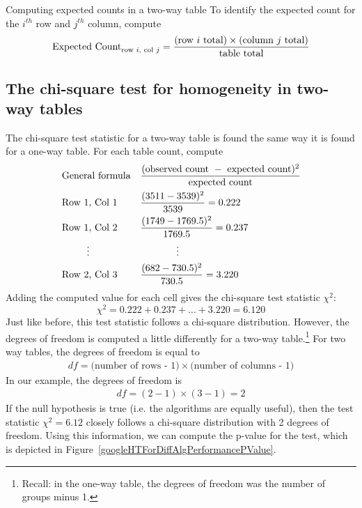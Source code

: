 \D{\newpage}

\begin{onebox}{Computing expected counts in a two-way table}
To identify the expected count for the $i^{th}$ row and $j^{th}$ column, compute
$$\text{Expected Count}_{\text{row }i,\text{ col }j} = \frac{(\text{row $i$ total}) \times  (\text{column $j$ total})}{\text{table total}}\vspace{2mm}$$\end{onebox}


\subsection{The chi-square test for homogeneity in two-way tables}

The chi-square test statistic for a two-way table is found the same way it is found for a one-way table. For each table count, compute
\begin{align*}
&\text{General formula}& &\frac{(\text{observed count } - \text{ expected count})^2}{\text{expected count}} \\
&\text{Row 1, Col 1}& &\frac{(3511 - 3539)^2}{3539} = 0.222 \\
&\text{Row 1, Col 2}& &\frac{(1749 - 1769.5)^2}{1769.5} = 0.237 \\
& \hspace{9mm}\vdots & &\hspace{13mm}\vdots \\
&\text{Row 2, Col 3}& &\frac{(682 - 730.5)^2}{730.5} = 3.220
\end{align*}
Adding the computed value for each cell gives the chi-square test statistic $\chi^2$:
$$\chi^2 = 0.222 + 0.237 + \dots + 3.220 = 6.120$$
Just like before, this test statistic follows a chi-square distribution. However, the degrees of freedom is computed a little differently for a two-way table.\footnote{Recall: in the one-way table, the degrees of freedom was the number of groups minus 1.} For two way tables, the degrees of freedom is equal to
\begin{align*}
df = \text{(number of rows - 1)}\times \text{(number of columns - 1)}
\end{align*}
In our example, the degrees of freedom is
\begin{align*}
df = (2-1)\times (3-1) = 2
\end{align*}
If the null hypothesis is true (i.e. the algorithms are equally useful), then the test statistic $\chi^2 = 6.12$ closely follows a chi-square distribution with 2 degrees of freedom. Using this information, we can compute the p-value for the test, which is depicted in Figure~\ref{googleHTForDiffAlgPerformancePValue}.

